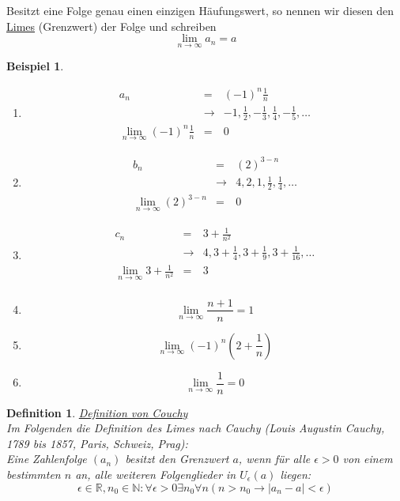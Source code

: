 \documentclass[a4paper,10pt]{report}
\newtheorem{mydef}{Definition}
\newtheorem{myexample}{Beispiel}
\begin{document}
\noindent
Besitzt eine Folge genau einen einzigen Häufungswert, so nennen wir diesen den \underline{Limes} (Grenzwert) der Folge und schreiben
\begin{equation*}\boxed{\lim_{n \to \infty}a_n = a }\end{equation*}
\begin{myexample}
\begin{enumerate}
\item
	\begin{eqnarray*}
		a_n &=& (-1)^n\frac{1}{n}\\
		&\rightarrow& -1, \frac{1}{2}, -\frac{1}{3}, \frac{1}{4}, -\frac{1}{5}, \ldots\\
		\lim_{n \to \infty}(-1)^n\frac{1}{n} &=& 0 
	\end{eqnarray*}
\item
	\begin{eqnarray*}
		b_n &=& (2)^{3-n}\\
		&\rightarrow& 4,2,1,\frac{1}{2},\frac{1}{4}, \ldots\\
		\lim_{n \to \infty}(2)^{3-n} &=& 0 
	\end{eqnarray*}
\item
	\begin{eqnarray*}
		c_n &=& 3+\frac{1}{n^2}\\
		&\rightarrow& 4,3+\frac{1}{4},3+\frac{1}{9},3+\frac{1}{16}, \ldots\\
		\lim_{n \to \infty}3+\frac{1}{n^2} &=& 3\\ 
	\end{eqnarray*} 
\item
	\begin{equation*}\lim_{n \to \infty}\frac{n+1}{n}=1\end{equation*}
\item 
	\begin{equation*}\lim_{n \to \infty}(-1)^n(2+\frac{1}{n})\end{equation*}
\item 
	\begin{equation*}\lim_{n \to \infty}\frac{1}{n}=0\end{equation*}
\end{enumerate}
\end{myexample}
\begin{mydef}\underline{Definition von Couchy}\\Im Folgenden die Definition des Limes nach Cauchy (Louis Augustin Cauchy, 1789 bis 1857, Paris, Schweiz, Prag):\\
Eine Zahlenfolge $(a_n)$ besitzt den Grenzwert $a$, wenn für alle $\epsilon > 0$ von einem bestimmten $n$ an, alle weiteren Folgenglieder in $U_\epsilon(a)$ liegen:
\begin{equation*}\epsilon \in \mathbb{R}, n_0 \in \mathbb{N}: \forall \epsilon > 0\exists n_0 \forall n (n > n_0 \to |a_n-a| < \epsilon)\end{equation*}\end{mydef}
\end{document}
